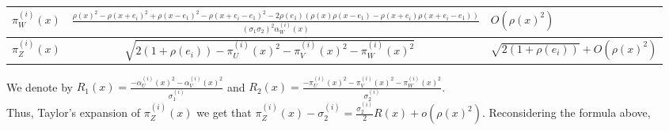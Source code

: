 \documentclass[12pt]{article}
\theoremstyle{Theorem}
\begin{document}
\begin{table}[H]
\begin{tabularx}{\textwidth}{|l| l|X|}
$ \pi^{\scriptscriptstyle(i)}_{W}(x) $ & $\frac{\rho(x)^{2} - \rho(x+e_i)^{2} + \rho(x-e_1)^{2} - \rho(x + e_i - e_1)^{2} - 2\rho(e_1)\left(\rho(x)\rho(x-e_1) - \rho(x+e_i)\rho(x+e_i-e_1)\right)}{(\sigma_{1}\sigma_{2})^{2}\alpha^{\scriptscriptstyle(i)}_{W}(x)}$ & $O\left(\rho(x)^2\right)$\\ \hline
$\pi^{\scriptscriptstyle(i)}_{Z}(x)$ & $ \hspace{2cm} \sqrt{2(1 + \rho(e_i)) - \pi^{\scriptscriptstyle(i)}_{U}(x)^{2} - \pi^{\scriptscriptstyle(i)}_{V}(x)^{2} - \pi^{\scriptscriptstyle(i)}_{W}(x)^{2}}$ & {\tiny$ \sqrt{2(1 + \rho(e_i)) } + O\left(\rho(x)^{2}\right)$} \\\hline 
\end{tabularx}
\end{table}
We denote by $R_{1}(x) = \frac{-\alpha^{\scriptscriptstyle(i)}_{U}(x)^{2} - \alpha^{\scriptscriptstyle(i)}_{V}(x)^{2}}{\sigma^{\scriptscriptstyle(i)}_{1}}$ and $R_{2}(x) = \frac{- \pi^{\scriptscriptstyle(i)}_{U}(x)^{2} - \pi^{\scriptscriptstyle(i)}_{V}(x)^{2} - \pi^{\scriptscriptstyle(i)}_{W}(x)^{2}}{\sigma^{\scriptscriptstyle(i)}_{2}}$.\\
Thus, Taylor's expansion of $\pi^{\scriptscriptstyle(i)}_{Z}(x)$ we get that $\pi^{\scriptscriptstyle(i)}_{Z}(x) -  \sigma^{\scriptscriptstyle(i)}_{2}  = \frac{\sigma^{\scriptscriptstyle(i)}_{2}}{2}R(x) + o(\rho(x)^{2})$.
Reconsidering the formula above,
\end{document}
